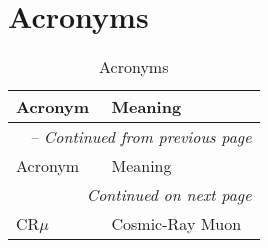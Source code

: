 \section{Acronyms}
\label{acronymsec}


\begin{longtable}{p{} p{}}
\caption{Acronyms} \label{tab:acronyms} \\

\toprule
Acronym & Meaning \\
\midrule
\endfirsthead

\multicolumn{2}{l}{\textit{\tablename\ \thetable{} -- Continued from previous page}} \\
\toprule
Acronym & Meaning \\
\midrule
\endhead

\multicolumn{2}{r}{\textit{Continued on next page}} \\
\bottomrule
\endfoot

\bottomrule
\endlastfoot


CR$\mu$ & Cosmic-Ray Muon \\

\end{longtable}
